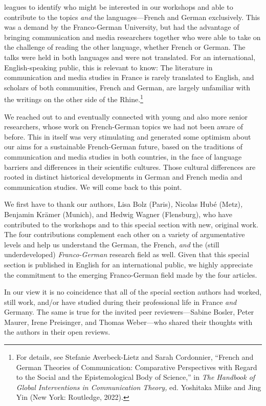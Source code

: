 \documentclass{tufte-handout}
\begin{document}
\noindent leagues
 to identify who might be interested in our workshops and able
to contribute to the topics \emph{and} the languages---French and German
exclusively. This was a demand by the Franco-German University, but had
the advantage of bringing communication and media researchers together
who were able to take on the challenge of reading the other language,
whether French or German. The talks were held in both languages and were
not translated. For an international, English-speaking public, this is
relevant to know: The literature in communication and media studies in
France is rarely translated to English, and scholars of both
communities, French and German, are largely unfamiliar with the writings
on the other side of the Rhine.\footnote{For details, see Stefanie
  Averbeck-Lietz and Sarah Cordonnier, ``French and German Theories of
  Communication: Comparative Perspectives with Regard to the Social and
  the Epistemological Body of Science,'' in \emph{The Handbook of Global
  Interventions in Communication Theory,} ed. Yoshitaka Miike and Jing
  Yin (New York: Routledge, 2022).}


We reached out to and eventually connected with young and also more
senior researchers, whose work on French-German topics we had not been
aware of before. This in itself was very stimulating and generated some
optimism about our aims for a sustainable French-German future, based on
the traditions of communication and media studies in both countries, in
the face of language barriers and differences in their scientific
cultures. Those cultural differences are rooted in distinct historical
developments in German and French media and communication studies. We
will come back to this point.

We first have to thank our authors, Lisa Bolz (Paris)\emph{,} Nicolas
Hubé (Metz)\emph{,} Benjamin Krämer (Munich), and Hedwig Wagner
(Flensburg), who have contributed to the workshops and to this special
section with new, original work. The four contributions complement each
other on a variety of argumentative levels and help us understand the
German, the French, \emph{and} the (still underdeveloped)
\emph{Franco-German} research field as well. Given that this special
section is published in English for an international public, we highly
appreciate the commitment to the emerging Franco-German field made by
the four articles.

In our view it is no coincidence that all of the special section authors
had worked, still work, and/or have studied during their professional
life in France \emph{and} Germany. The same is true for the invited peer
reviewers---Sabine Bosler, Peter Maurer, Irene Preisinger, and Thomas
Weber---who shared their thoughts with the authors in their open
reviews.
\end{document}
